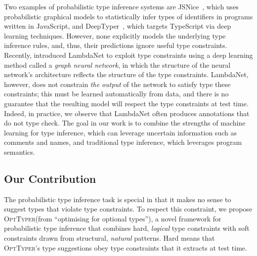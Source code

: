 \documentclass[acmsmall, review, anonymous]{acmart}\settopmatter{printfolios=true,printccs=false,printacmref=false}
\newcommand{\projectname}{\textsc{OptTyper}\xspace}
\begin{document}
Two examples of probabilistic type inference systems are JSNice~\cite{raychev15},
which uses probabilistic graphical models to statistically infer types of identifiers
in programs written in JavaScript,
and DeepTyper~\cite{hellendoorn18}, which targets TypeScript via deep learning techniques.
However, none explicitly models the underlying
type inference rules, and, thus, their predictions ignore useful type constraints. 
Recently, \citet{wei20} introduced LambdaNet to exploit type constraints using a deep learning
method called a \emph{graph neural network}, in which
the structure of the neural network's architecture reflects the structure of the type constraints.
LambdaNet, however, does not constrain 
\emph{the output} of the network to satisfy type these constraints;
this must be learned automatically from data,
and there is no guarantee that the resulting model will respect the type constraints at test time. 
Indeed, in practice, we observe that LambdaNet
often produces annotations that do not type check.
The goal in our work is to combine
the strengths of machine learning for
type inference, which can leverage
uncertain information such as comments
and names, and traditional type inference,
which leverages program semantics.

\subsection{Our Contribution}

The probabilistic type inference task is special in that it makes no sense to suggest types that violate type constraints.
To respect this constraint, we propose \projectname (from ``optimising for optional types''), a novel framework for probabilistic type inference that combines hard, \textit{logical} type constraints with soft constraints drawn from structural, \textit{natural} patterns.
Hard means that \projectname's type suggestions obey type constraints that it extracts at test time.
\end{document}
